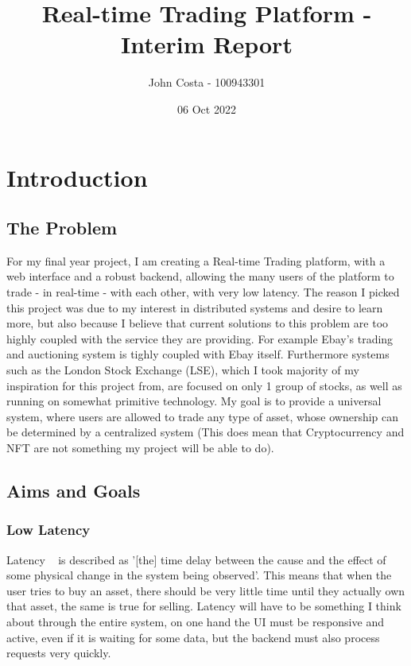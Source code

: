 \documentclass[titlepage]{article}
\title{Real-time Trading Platform - Interim Report}
\author{John Costa - 100943301}
\date{06 Oct 2022} \\ \\
\begin{document}
\maketitle

\tableofcontents
\newpage

\section{Introduction}
\subsection{The Problem}
For my final year project, I am creating a Real-time Trading platform, with a web interface and a robust backend, allowing the many users of the platform to trade - in real-time - with each other, with very low latency. The reason I picked this project was due to my interest in distributed systems and desire to learn more, but also because I believe that current solutions to this problem are too highly coupled with the service they are providing. For example Ebay's trading and auctioning system is tighly coupled with Ebay itself. Furthermore systems such as the London Stock Exchange (LSE), which I took majority of my inspiration for this project from, are focused on only 1 group of stocks, as well as running on somewhat primitive technology. My goal is to provide a universal system, where users are allowed to trade any type of asset, whose ownership can be determined by a centralized system (This does mean that Cryptocurrency and NFT are not something my project will be able to do).

\subsection{Aims and Goals}

\subsubsection{Low Latency}
Latency ~\cite{latency} is described as '[the] time delay between the cause and the effect of some physical change in the system being observed'. This means that when the user tries to buy an asset, there should be very little time until they actually own that asset, the same is true for selling. Latency will have to be something I think about through the entire system, on one hand the UI must be responsive and active, even if it is waiting for some data, but the backend must also process requests very quickly.
\end{document}
